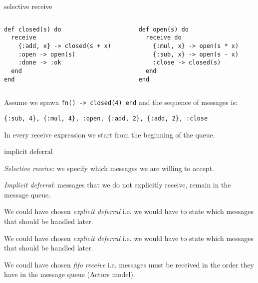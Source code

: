 \begin{frame}[fragile]{selective receive}

\begin{columns}
 \begin{column}{0.5\linewidth}
\begin{verbatim}
def closed(s) do
  receive 
    {:add, x} -> closed(s + x)
    :open -> open(s)
    :done -> :ok
  end
end
\end{verbatim}
 \end{column}
\pause
 \begin{column}{0.5\linewidth}
\begin{verbatim}
def open(s) do
  receive do
    {:mul, x} -> open(s * x)
    {:sub, x} -> open(s - x)
    :close -> closed(s)
  end
end
\end{verbatim}
\end{column}
\end{columns}


\pause\vspace{10pt}

Assume we spawn {\tt fn() -> closed(4) end} and the sequence of messages is:

\vspace{10pt}

{\tt \{:sub, 4\}, \{:mul, 4\}, :open, \{:add, 2\}, \{:add, 2\}, :close}

\pause\vspace{10pt}

In every receive expression we start from the beginning of the queue.

\end{frame}


\begin{frame}{implicit deferral}

{\em Selective receive}: we specify which messages we are willing to accept.

{\em Implicit deferral}: messages that we do not explicitly receive, remain in the message queue.

\pause\vspace{20pt}

We could have chosen {\em explicit deferral} i.e. we would have to
state which messages that should be handled later.

\pause\vspace{20pt}

We could have chosen {\em explicit deferral} i.e. we would have to
state which messages that should be handled later.

\pause\vspace{20pt}

We coudl have chosen {\em fifo receive} i.e. messages must be received
in the order they have in the message queue (Actors model).

\end{frame}

